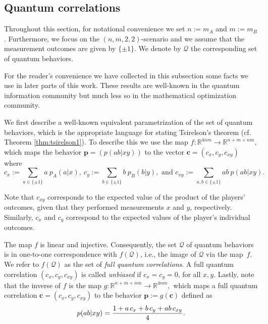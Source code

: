 \documentclass{siamart}
\begin{document}
{\subsection{Quantum  correlations}\label{sec:tsirelson}

Throughout this section, for notational convenience we
set $n:=m_A$ and $m:=m_B$. Furthermore, we   focus on the $(n,m,2,2)$-scenario and we assume that the measurement outcomes are  given by  $\{\pm 1\}$. We denote by ${\mathcal{Q}}$ the corresponding set of quantum behaviors.

{For the reader's convenience  we have collected   in this
subsection some facts we use in later parts of this work. These
results are  well-known in the quantum information community but
much less so {in} the mathematical optimization community. }

We first describe a well-known equivalent  parametrization of the set of quantum behaviors, which is the  appropriate  language for stating
 Tsirelson's theorem (cf. Theorem \ref{thm:tsirelson1}). To describe  this we use the map  $f :{\mathbb{R}}^{4nm}  \rightarrow  {\mathbb{R}}^{n+m+nm},$ which maps the  behavior ${\mathbf{p}}=\left(p(ab|xy)\right)$  to the vector  $\mathbf{c}=\left( c_x, c_y, c_{xy}\right)$ where
  \begin{equation}\label{eq:expectations}
   c_x:=\sum_{a\in \{\pm 1\}}a\ p_A(a|x), \  c_y:=\sum_{b\in \{\pm 1\}} b\  p_B(b|y), \text{ and }  c_{xy}:=\sum_{a,b\in \{\pm 1\}}ab\ p(ab|xy).
\end{equation}

Note that $c_{xy}$ corresponds to the expected value  of the product of the players' outcomes, given that they performed measurements $x$ and $y$, respectively.  Similarly, $c_x$  and  $c_y$ correspond to the  expected values of the player's individual outcomes.

The map $f$  is   linear and injective. Consequently,
 the set ${\mathcal{Q}}$  of quantum behaviors  is  in one-to-one correspondence with
$f({\mathcal{Q}})$, i.e.,  the image of ${\mathcal{Q}}$    via the map~$f$. We refer to $f({\mathcal{Q}})$  as the set  of {\em full quantum  correlations}. A  full quantum correlation $ \left( c_x, c_y, c_{xy}\right)$ is called {\em unbiased} if $c_x=c_y=0$, for all $x,y$. Lastly, note that
the inverse of $f$ is the map $g:  {\mathbb{R}}^{n+m+nm} \rightarrow {\mathbb{R}}^{4nm}, $ which maps a full quantum correlation  $\mathbf{c}=\left( c_x, c_y, c_{xy}\right)$   to  the {behavior} ${\mathbf{p}}:=g({\mathbf{c}})$  defined as
\begin{equation}\label{eq:expectationstovectors}
p(ab|xy)={1 + a \, c_x + b \, c_y + ab \, c_{xy} \over 4}.
\end{equation}

}
\end{document}

